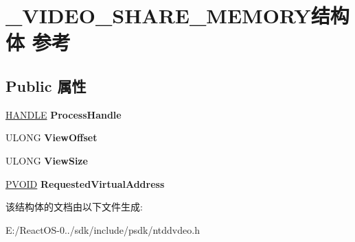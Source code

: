 \hypertarget{struct___v_i_d_e_o___s_h_a_r_e___m_e_m_o_r_y}{}\section{\+\_\+\+V\+I\+D\+E\+O\+\_\+\+S\+H\+A\+R\+E\+\_\+\+M\+E\+M\+O\+R\+Y结构体 参考}
\label{struct___v_i_d_e_o___s_h_a_r_e___m_e_m_o_r_y}
\subsection*{Public 属性}
\begin{DoxyCompactItemize}
\item 
\mbox{\label{struct___v_i_d_e_o___s_h_a_r_e___m_e_m_o_r_y_a9eacb6742bd4222759326eece28e3a40}} 
\hyperlink{interfacevoid}{H\+A\+N\+D\+LE} {\bfseries Process\+Handle}
\item 
\mbox{\label{struct___v_i_d_e_o___s_h_a_r_e___m_e_m_o_r_y_a9e8ed64f8215fe9fb57fcdb2e32093a9}} 
U\+L\+O\+NG {\bfseries View\+Offset}
\item 
\mbox{\label{struct___v_i_d_e_o___s_h_a_r_e___m_e_m_o_r_y_a02a7f5d7c93432bcb2b12ba44ff9d85e}} 
U\+L\+O\+NG {\bfseries View\+Size}
\item 
\mbox{\label{struct___v_i_d_e_o___s_h_a_r_e___m_e_m_o_r_y_a212ad46331061989a8d19c9e62284e74}} 
\hyperlink{interfacevoid}{P\+V\+O\+ID} {\bfseries Requested\+Virtual\+Address}
\end{DoxyCompactItemize}


该结构体的文档由以下文件生成\+:\begin{DoxyCompactItemize}
\item 
E\+:/\+React\+O\+S-\/0../sdk/include/psdk/ntddvdeo.\+h\end{DoxyCompactItemize}
